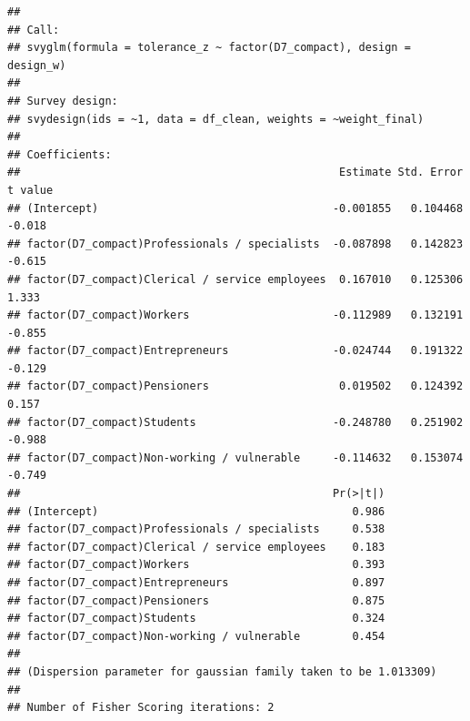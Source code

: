 \documentclass[
]{article}
\begin{document}
\begin{verbatim}
## 
## Call:
## svyglm(formula = tolerance_z ~ factor(D7_compact), design = design_w)
## 
## Survey design:
## svydesign(ids = ~1, data = df_clean, weights = ~weight_final)
## 
## Coefficients:
##                                                 Estimate Std. Error t value
## (Intercept)                                    -0.001855   0.104468  -0.018
## factor(D7_compact)Professionals / specialists  -0.087898   0.142823  -0.615
## factor(D7_compact)Clerical / service employees  0.167010   0.125306   1.333
## factor(D7_compact)Workers                      -0.112989   0.132191  -0.855
## factor(D7_compact)Entrepreneurs                -0.024744   0.191322  -0.129
## factor(D7_compact)Pensioners                    0.019502   0.124392   0.157
## factor(D7_compact)Students                     -0.248780   0.251902  -0.988
## factor(D7_compact)Non-working / vulnerable     -0.114632   0.153074  -0.749
##                                                Pr(>|t|)
## (Intercept)                                       0.986
## factor(D7_compact)Professionals / specialists     0.538
## factor(D7_compact)Clerical / service employees    0.183
## factor(D7_compact)Workers                         0.393
## factor(D7_compact)Entrepreneurs                   0.897
## factor(D7_compact)Pensioners                      0.875
## factor(D7_compact)Students                        0.324
## factor(D7_compact)Non-working / vulnerable        0.454
## 
## (Dispersion parameter for gaussian family taken to be 1.013309)
## 
## Number of Fisher Scoring iterations: 2
\end{verbatim}
\end{document}
